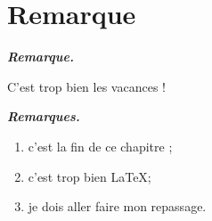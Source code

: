 \documentclass[french,10pt]{book}
\newenvironment{Rmq}[1][]%
{
\normalsize
\textit{\textbf{Remarque#1.}}\par
}
{
\medskip
}%
\begin{document}
\section{Remarque}

\begin{Rmq}
    C'est trop bien les vacances !
\end{Rmq}

\begin{Rmq}[s]
    \begin{enumerate}
        \item c'est la fin de ce chapitre ;
        \item c'est trop bien \LaTeX ;
        \item je dois aller faire mon repassage.
    \end{enumerate}
\end{Rmq}


\end{document}
